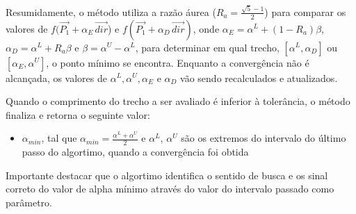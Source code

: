 \documentclass[10pt, a4paper]{article}
\begin{document}
Resumidamente, o método utiliza a razão áurea ($R_a = \frac{\sqrt{5} - 1}{2}$) para comparar os 
valores de $f(\overrightarrow{P_1} + \alpha_{E}\,\overrightarrow{dir}$) e $f(\overrightarrow{P_1} + \alpha_{D}\,\overrightarrow{dir})$,
onde $\alpha_{E} = \alpha^L + (1 - R_a )\beta$, $\alpha_{D} = \alpha^L + R_a\beta$ e $\beta = \alpha^U - \alpha^L$, 
para determinar em qual trecho, $[\alpha^L, \alpha_{D}]$ ou $[\alpha_{E}, \alpha^U]$, o ponto mínimo se encontra. Enquanto a
convergência não é alcançada, os valores de $\alpha^L, \alpha^U, \alpha_E$ e $\alpha_D$ vão sendo recalculados e atualizados.

Quando o comprimento do trecho a ser avaliado é inferior à tolerância, o método finaliza e retorna o seguinte valor:

\begin{itemize}
  \item $\alpha_{min}$, tal que $\alpha_{min} = \frac{\alpha^L + \alpha^U}{2}$ e $\alpha^L$, $\alpha^U$ são os extremos do
  intervalo do último passo do algortimo, quando a convergência foi obtida
\end{itemize} 

Importante destacar que o algortimo identifica o sentido de busca e os sinal correto do valor de alpha mínimo através do valor do intervalo passado como parâmetro.
\end{document}
